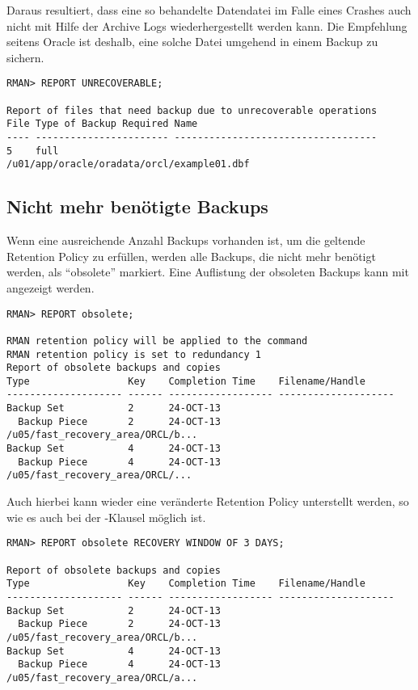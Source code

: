         Daraus resultiert, dass eine so behandelte Datendatei im Falle eines
        Crashes auch nicht mit Hilfe der Archive Logs wiederhergestellt werden
        kann. Die Empfehlung seitens Oracle ist deshalb, eine solche Datei
        umgehend in einem Backup zu sichern.
        \begin{lstlisting}[caption={Datenbankdateien die nicht rekonstruierbare Operationen enthalten aufsp\"uren},label=admin1356,language=rman]
RMAN> REPORT UNRECOVERABLE;

Report of files that need backup due to unrecoverable operations
File Type of Backup Required Name
---- ----------------------- -----------------------------------
5    full                    /u01/app/oracle/oradata/orcl/example01.dbf
        \end{lstlisting}
      \subsection{Nicht mehr ben\"otigte Backups}
        Wenn eine ausreichende Anzahl Backups vorhanden ist, um die geltende
        Retention Policy zu erf\"ullen, werden alle Backups, die nicht mehr
        ben\"otigt werden, als \enquote{obsolete} markiert. Eine Auflistung der
        obsoleten Backups kann mit  angezeigt werden.
        \begin{lstlisting}[caption={Backups die nicht mehr ben\"otigt werden anzeigen},label=admin1357,language=rman]
RMAN> REPORT obsolete;

RMAN retention policy will be applied to the command
RMAN retention policy is set to redundancy 1
Report of obsolete backups and copies
Type                 Key    Completion Time    Filename/Handle
-------------------- ------ ------------------ --------------------
Backup Set           2      24-OCT-13
  Backup Piece       2      24-OCT-13          /u05/fast_recovery_area/ORCL/b...
Backup Set           4      24-OCT-13
  Backup Piece       4      24-OCT-13          /u05/fast_recovery_area/ORCL/...
        \end{lstlisting}
        Auch hierbei kann wieder eine ver\"anderte Retention Policy unterstellt werden, so wie es auch bei der -Klausel m\"oglich ist.
        \begin{lstlisting}[caption={Backups die nicht mehr ben\"otigt werden anzeigen},label=admin1358,language=rman]
RMAN> REPORT obsolete RECOVERY WINDOW OF 3 DAYS;

Report of obsolete backups and copies
Type                 Key    Completion Time    Filename/Handle
-------------------- ------ ------------------ --------------------
Backup Set           2      24-OCT-13
  Backup Piece       2      24-OCT-13          /u05/fast_recovery_area/ORCL/b...
Backup Set           4      24-OCT-13
  Backup Piece       4      24-OCT-13          /u05/fast_recovery_area/ORCL/a...
        \end{lstlisting}
